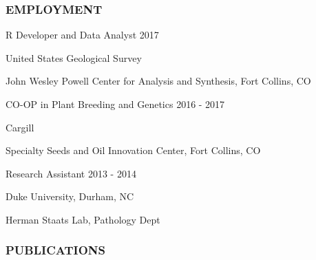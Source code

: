 \documentclass[12pt,english]{article}
\begin{document}

\subsubsection*{EMPLOYMENT}
\vspace{-0.5ex}\par

\hspace{1.0em} R Developer and Data Analyst
\hfill 
2017
\vspace{-0.5ex}\par
\hspace{2.0em} United States Geological Survey
\vspace{-0.5ex}\par
\hspace{2.0em} John Wesley Powell Center for Analysis and Synthesis, Fort Collins, CO
\hfill 
\vspace{0.5em}\par

\hspace{1.0em} CO-OP in Plant Breeding and Genetics
\hfill 
2016 - 2017
\vspace{-0.5ex}\par
\hspace{2.0em} Cargill
\vspace{-0.5ex}\par
\hspace{2.0em} Specialty Seeds and Oil Innovation Center, Fort Collins, CO
\vspace{0.5em}\par

\hspace{1.0em} Research Assistant
\hfill 
2013 - 2014
\vspace{-0.5ex}\par
\hspace{2.0em} Duke University, Durham, NC
\vspace{-0.5ex}\par
\hspace{2.0em} Herman Staats Lab, Pathology Dept

\vspace{0.5em}\par

\subsubsection*{PUBLICATIONS}
\vspace{-0.5ex}
\end{document}
